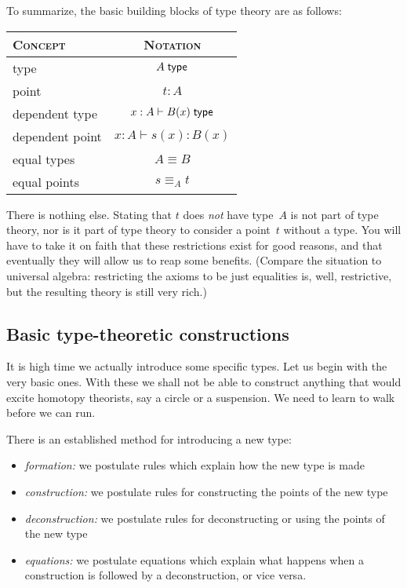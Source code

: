 \documentclass{article}
\begin{document}
To summarize, the basic building blocks of type theory are as follows:
%
\begin{center}
\begin{tabular}{lc}
  \toprule
  \textsc{Concept} & \textsc{Notation} \\
  \midrule
  type             & $A\; \mathsf{type}$ \\
  point            & $t : A$ \\
  dependent type   & $x : A \vdash B(x)\; \mathsf{type}$ \\
  dependent point  & $x : A \vdash s(x) : B(x)$ \\
  equal types      & $A \equiv B$ \\
  equal points     & $s \equiv_A t$ \\
  \bottomrule
\end{tabular}
\end{center}
%
There is nothing else. Stating that $t$ does \emph{not} have type~$A$ is not
part of type theory, nor is it part of type theory to consider a point~$t$
without a type. You will have to take it on faith that these restrictions exist
for good reasons, and that eventually they will allow us to reap some benefits.
(Compare the situation to universal algebra: restricting the axioms to be just
equalities is, well, restrictive, but the resulting theory is still very rich.)

\subsection{Basic type-theoretic constructions}

It is high time we actually introduce some specific types. Let us begin with the
very basic ones. With these we shall not be able to construct anything that
would excite homotopy theorists, say a circle or a suspension. We need to learn
to walk before we can run.

There is an established method for introducing a new type:
%
\begin{itemize}
\item \emph{formation:} we postulate rules which explain how the new type is made
\item \emph{construction:} we postulate rules for constructing the points of the new type
\item \emph{deconstruction:} we postulate rules for deconstructing or using the points of the new type
\item \emph{equations:} we postulate equations which explain what happens when a
  construction is followed by a deconstruction, or vice versa.
\end{itemize}
%
\end{document}
